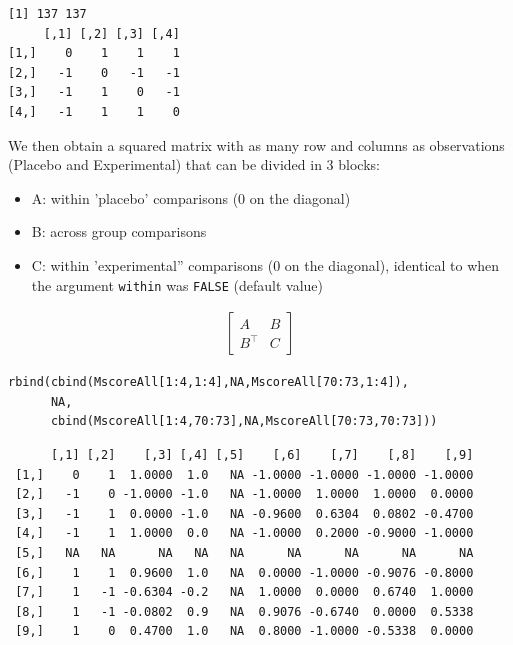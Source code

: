 \documentclass[12pt]{article}
\newcommand\trans[1]{{#1}^\intercal}%
\begin{document}
\begin{verbatim}
[1] 137 137
     [,1] [,2] [,3] [,4]
[1,]    0    1    1    1
[2,]   -1    0   -1   -1
[3,]   -1    1    0   -1
[4,]   -1    1    1    0
\end{verbatim}


We then obtain a squared matrix with as many row and columns as
observations (Placebo and Experimental) that can be divided in 3 blocks:

\medskip

\begin{minipage}{0.7\linewidth}
\begin{itemize}
\item A: within 'placebo' comparisons (0 on the diagonal)
\item B: across group comparisons
\item C: within 'experimental'' comparisons (0 on the diagonal), \newline identical to
when the argument \texttt{within} was \texttt{FALSE} (default value)
\end{itemize}
\end{minipage}
\begin{minipage}{0.27\linewidth}
\begin{align*}
\begin{bmatrix}
A & B \\ \trans{B} & C
\end{bmatrix}
\end{align*}
\end{minipage}

\bigskip

\lstset{language=r,label= ,caption= ,captionpos=b,numbers=none}
\begin{lstlisting}
rbind(cbind(MscoreAll[1:4,1:4],NA,MscoreAll[70:73,1:4]),
      NA,
      cbind(MscoreAll[1:4,70:73],NA,MscoreAll[70:73,70:73]))
\end{lstlisting}

\begin{verbatim}
      [,1] [,2]    [,3] [,4] [,5]    [,6]    [,7]    [,8]    [,9]
 [1,]    0    1  1.0000  1.0   NA -1.0000 -1.0000 -1.0000 -1.0000
 [2,]   -1    0 -1.0000 -1.0   NA -1.0000  1.0000  1.0000  0.0000
 [3,]   -1    1  0.0000 -1.0   NA -0.9600  0.6304  0.0802 -0.4700
 [4,]   -1    1  1.0000  0.0   NA -1.0000  0.2000 -0.9000 -1.0000
 [5,]   NA   NA      NA   NA   NA      NA      NA      NA      NA
 [6,]    1    1  0.9600  1.0   NA  0.0000 -1.0000 -0.9076 -0.8000
 [7,]    1   -1 -0.6304 -0.2   NA  1.0000  0.0000  0.6740  1.0000
 [8,]    1   -1 -0.0802  0.9   NA  0.9076 -0.6740  0.0000  0.5338
 [9,]    1    0  0.4700  1.0   NA  0.8000 -1.0000 -0.5338  0.0000
\end{verbatim}
\end{document}

